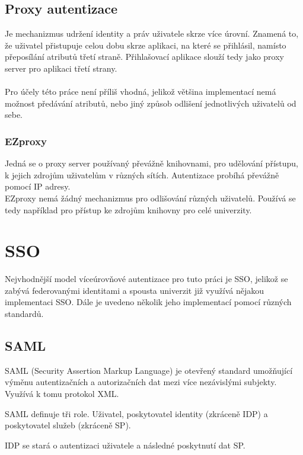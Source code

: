 \section{Proxy autentizace}
Je mechanizmus udržení identity a práv uživatele skrze více úrovní. Znamená to, že uživatel přistupuje celou dobu skrze aplikaci, na které se přihlásil, namísto přeposílání atributů třetí straně. Přihlašovací aplikace slouží tedy jako proxy server pro aplikaci třetí strany. \cite{ProxyA} \\ \\
Pro účely této práce není příliš vhodná, jelikož většina implementací nemá možnost předávání atributů, nebo jiný způsob odlišení jednotlivých uživatelů od sebe.

\subsection{EZproxy}
Jedná se o proxy server používaný převážně knihovnami, pro udělování přístupu, k jejich zdrojům uživatelům v různých sítích. Autentizace probíhá převážně pomocí IP adresy.\\
EZproxy nemá žádný mechanizmus pro odlišování různých uživatelů. Používá se tedy například pro přístup ke zdrojům knihovny pro celé univerzity. \cite{EZproxy}\cite{wikiEZproxy}

\chapter{SSO}

Nejvhodnější model víceúrovňové autentizace pro tuto práci je SSO, jelikož se zabývá federovanými identitami a spousta univerzit již využívá nějakou implementaci SSO.
Dále je uvedeno několik jeho implementací pomocí různých standardů. 

\section{SAML}

SAML\cite{SAMLofficialSite}\cite{WhatIsSaml} (Security Assertion Markup Language) je otevřený standard umožňující výměnu autentizačních a autorizačních dat mezi více nezávislými subjekty. Využívá k tomu protokol XML. 

SAML definuje tři role. Uživatel, poskytovatel identity (zkráceně IDP) a poskytovatel služeb (zkráceně SP). 

IDP se stará o autentizaci uživatele a následné poskytnutí dat SP.

